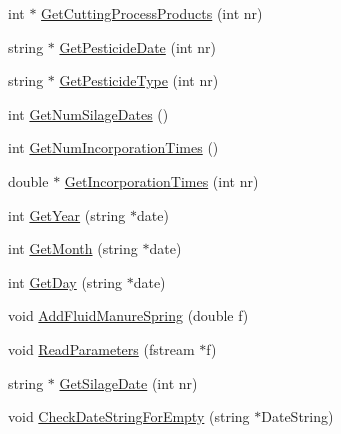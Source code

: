 \begin{DoxyCompactItemize}
int $\ast$ \hyperlink{classfield_order_aab414a15c455a7b0146a9e84a5a4e1c8}{GetCuttingProcessProducts} (int nr)
\item 
string $\ast$ \hyperlink{classfield_order_a2c589d11f3f384f082ac5563db9b201a}{GetPesticideDate} (int nr)
\item 
string $\ast$ \hyperlink{classfield_order_a102e6b007330a88bf9977f8d3c042abd}{GetPesticideType} (int nr)
\item 
int \hyperlink{classfield_order_a6792b509c8d451900adbf875d9a476b9}{GetNumSilageDates} ()
\item 
int \hyperlink{classfield_order_a00e598e6bee6ef3a0681b1f0b569cc38}{GetNumIncorporationTimes} ()
\item 
double $\ast$ \hyperlink{classfield_order_a7d9ae7b04868f1b71abfa18be6c71053}{GetIncorporationTimes} (int nr)
\item 
int \hyperlink{classfield_order_af66dab2622b81f860f238509146f4361}{GetYear} (string $\ast$date)
\item 
int \hyperlink{classfield_order_acbdb5acd2ca5a623bc49b1ba114502e7}{GetMonth} (string $\ast$date)
\item 
int \hyperlink{classfield_order_aa6eb66e6497f4d7b959070e689276bd3}{GetDay} (string $\ast$date)
\item 
void \hyperlink{classfield_order_a8102a5fa37a4b0783732d6776ca0855f}{AddFluidManureSpring} (double f)
\item 
void \hyperlink{classfield_order_a00ed3e67467f00acb832799273b0f04a}{ReadParameters} (fstream $\ast$f)
\item 
string $\ast$ \hyperlink{classfield_order_a57b5137627a83358c7056d5a4b6e1949}{GetSilageDate} (int nr)
\item 
void \hyperlink{classfield_order_a2d96466ecd6bd5fec245340cc9a8e409}{CheckDateStringForEmpty} (string $\ast$DateString)
\end{DoxyCompactItemize}


